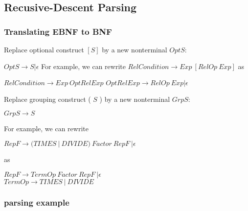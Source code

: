 \subsection{Recusive-Descent Parsing}
\subsubsection{Translating EBNF to BNF}

Replace optional construct $[S]$ by a new nonterminal $OptS$:

$OptS \rightarrow S | \epsilon$ \newline
For example, we can rewrite
$RelCondition \rightarrow Exp \ [RelOp \ Exp]$ \newline
as

$RelCondition \rightarrow Exp \ OptRelExp$
$OptRelExp \rightarrow RelOp \ Exp | \epsilon$

Replace grouping construct ( $S$ ) by a new nonterminal $GrpS$:

$GrpS \rightarrow S$

For example, we can rewrite

$RepF \rightarrow (TIMES \ | \ DIVIDE) \ Factor \ RepF \ | \epsilon$

as 

$RepF \rightarrow TermOp \ Factor \ RepF \ | \epsilon$ \\
$TermOp \rightarrow TIMES \ | \ DIVIDE$

\subsubsection{parsing example}
\vspace*{6.5cm}

\vspace*{0.3cm}
\newblock